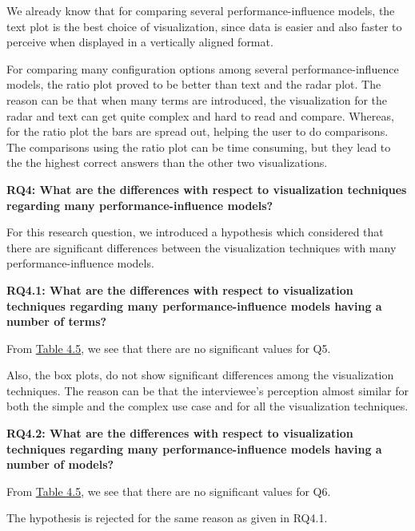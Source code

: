 We already know that for comparing several performance-influence models, the text plot is the best choice of visualization, since data is easier and also faster to perceive when displayed in a vertically aligned format.

For comparing many configuration options among several performance-influence models, the ratio plot proved to be better than text and the radar plot. The reason can be that when many terms are introduced, the visualization for the radar and text can get quite complex and hard to read and compare. Whereas, for the ratio plot the bars are spread out, helping the user to do comparisons. The comparisons using the ratio plot can be time consuming, but they lead to the the highest correct answers than the other two visualizations.

\vskip 0.2in
\begin{mdframed}
\textbf {RQ4: What are the differences with respect to visualization techniques regarding many performance-influence models?}
\end{mdframed}

For this research question, we introduced a hypothesis which considered that there are significant differences between the visualization techniques with many performance-influence models.

\begin{mdframed}
\textbf{RQ4.1: What are the differences with respect to visualization techniques regarding many performance-influence models having a number of terms?}
\end{mdframed}

From \hyperref[table:q5q6MannWhitney]{Table 4.5}, we see that there are no significant values for Q5. 

Also, the box plots, do not show significant differences among the visualization techniques. The reason can be that the interviewee's perception almost similar for both the simple and the complex use case and for all the visualization techniques.


\begin{mdframed}
\textbf{RQ4.2: What are the differences with respect to visualization techniques regarding many performance-influence models having a number of models?}
\end{mdframed}

From \hyperref[table:q5q6MannWhitney]{Table 4.5}, we see that there are no significant values for Q6. 

The hypothesis is rejected for the same reason as given in RQ4.1.


